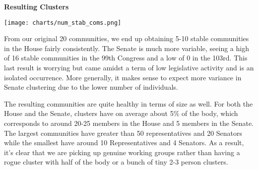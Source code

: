 \textbf{Resulting Clusters}

\texttt{[image: charts/num\_stab\_coms.png]}

From our original 20 communities, we end up obtaining 5-10 stable communities in the House fairly consistently. The Senate is much more variable, seeing a high of 16 stable communities in the 99th Congress and a low of 0 in the 103rd. This last result is worrying but came amidst a term of low legislative activity and is an isolated occurrence. More generally, it makes sense to expect more variance in Senate clustering due to the lower number of individuals.

The resulting communities are quite healthy in terms of size as well. For both the House and the Senate, clusters have on average about 5\% of the body, which corresponds to around 20-25 members in the House and 5 members in the Senate. The largest communities have greater than 50 representatives and 20 Senators while the smallest have around 10 Representatives and 4 Senators. As a result, it's clear that we are picking up genuine working groups rather than having a rogue cluster with half of the body or a bunch of tiny 2-3 person clusters.
